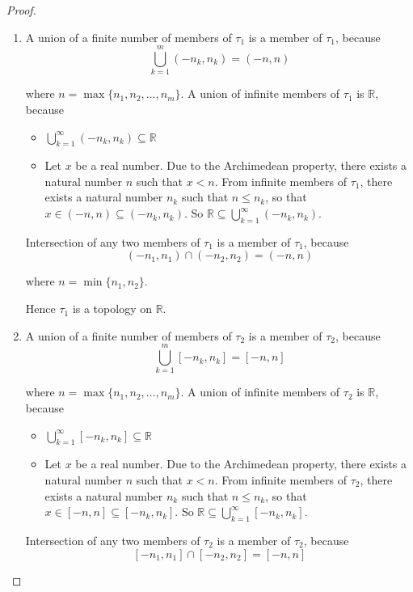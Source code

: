 \begin{proof}
	\begin{enumerate}[label={(\roman*)}]
		\item A union of a finite number of members of $\tau_{1}$ is a member of $\tau_{1}$, because
		      \[
			      \bigcup^{m}_{k=1} (-n_{k}, n_{k}) = (-n, n)
		      \]

		      where $n = \max\{ n_{1}, n_{2}, \ldots, n_{m} \}$. A union of infinite members of $\tau_{1}$ is $\mathbb{R}$, because
		      \begin{itemize}
			      \item $\bigcup^{\infty}_{k=1} (-n_{k}, n_{k})\subseteq \mathbb{R}$
			      \item Let $x$ be a real number. Due to the Archimedean property, there exists a natural number $n$ such that $x < n$. From infinite members of $\tau_{1}$, there exists a natural number $n_{k}$ such that $n\leq n_{k}$, so that $x\in (-n, n)\subseteq (-n_{k}, n_{k})$. So $\mathbb{R}\subseteq \bigcup^{\infty}_{k=1} (-n_{k}, n_{k})$.
		      \end{itemize}

		      Intersection of any two members of $\tau_{1}$ is a member of $\tau_{1}$, because
		      \[
			      (-n_{1}, n_{1})\cap (-n_{2}, n_{2}) = (-n, n)
		      \]

		      where $n = \min\{ n_{1}, n_{2} \}$.

		      Hence $\tau_{1}$ is a topology on $\mathbb{R}$.
		\item A union of a finite number of members of $\tau_{2}$ is a member of $\tau_{2}$, because
		      \[
			      \bigcup^{m}_{k=1} [-n_{k}, n_{k}] = [-n, n]
		      \]

		      where $n = \max\{ n_{1}, n_{2}, \ldots, n_{m} \}$. A union of infinite members of $\tau_{2}$ is $\mathbb{R}$, because
		      \begin{itemize}
			      \item $\bigcup^{\infty}_{k=1} [-n_{k}, n_{k}]\subseteq \mathbb{R}$
			      \item Let $x$ be a real number. Due to the Archimedean property, there exists a natural number $n$ such that $x < n$. From infinite members of $\tau_{2}$, there exists a natural number $n_{k}$ such that $n\leq n_{k}$, so that $x\in [-n, n]\subseteq [-n_{k}, n_{k}]$. So $\mathbb{R}\subseteq \bigcup^{\infty}_{k=1} [-n_{k}, n_{k}]$.
		      \end{itemize}

		      Intersection of any two members of $\tau_{2}$ is a member of $\tau_{2}$, because
		      \[
			      [-n_{1}, n_{1}]\cap [-n_{2}, n_{2}] = [-n, n]
		      \]


\end{enumerate}
\end{proof}
